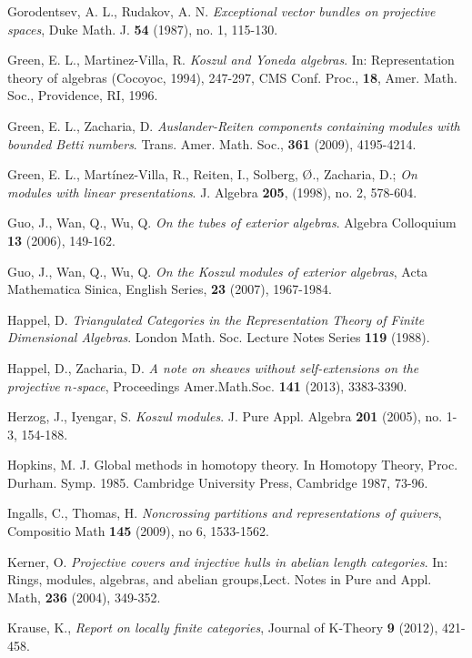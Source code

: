 \documentclass[10pt]{amsart}
\begin{document}
\begin{thebibliography}{99}
 Gorodentsev, A. L., Rudakov, A. N. {\it Exceptional vector bundles on projective spaces},  Duke Math. J. {\bf 54} (1987), no. 1, 115-130. 

 Green,  E. L., Martinez-Villa, R. {\it 
Koszul and
Yoneda algebras}. In: Representation theory of algebras 
(Cocoyoc, 1994),  247-297,
CMS Conf. Proc., {\bf 18}, Amer. Math. Soc., 
Providence, RI, 1996.


 Green, E. L., Zacharia, D. {\it Auslander-Reiten components containing modules
with bounded Betti numbers}. Trans. Amer. Math. Soc., {\bf 361}  (2009), 4195-4214. 

 Green, E. L., Mart\'inez-Villa, R., Reiten, I.,
Solberg, \O., Zacharia, D.; {\it On modules with linear
presentations}. J. Algebra {\bf  205}, (1998), no. 2, 578-604.

 Guo, J., Wan, Q., Wu, Q. {\it On the tubes of exterior algebras}. Algebra Colloquium 
{\bf 13} (2006), 149-162.

 Guo, J., Wan, Q., Wu, Q. {\it On the Koszul modules of exterior algebras}, 
Acta Mathematica Sinica, English Series, {\bf 23} (2007), 1967-1984.

 Happel, D. {\it Triangulated Categories in the Representation Theory of Finite Dimensional Algebras}. 
London Math. Soc. Lecture Notes Series
{\bf 119} (1988).

 Happel, D., Zacharia, D. {\it A note on sheaves without self-extensions on the projective $n$-space}, 
Proceedings Amer.Math.Soc. {\bf 141} (2013), 3383-3390.

 Herzog, J., Iyengar, S. {\it Koszul 
modules}. J. Pure Appl. Algebra {\bf 201} (2005), no. 1-3, 154-188.

 Hopkins, M. J. {Global methods in homotopy theory}. In Homotopy Theory, Proc. Durham. Symp. 1985. Cambridge University Press, Cambridge 1987, 73-96.

 Ingalls, C., Thomas, H. {\it Noncrossing partitions and representations of quivers}, Compositio Math {\bf 145} (2009), no 6, 1533-1562.

 Kerner, O. {\it Projective covers and injective hulls in abelian length categories}. In: Rings, modules,
algebras, and abelian groups,Lect. Notes in Pure and Appl. Math, {\bf 236} (2004), 349-352.

 Krause, K., {\it Report on locally finite categories}, Journal of K-Theory {\bf 9} (2012), 421-458.


\end{thebibliography}
\end{document}
